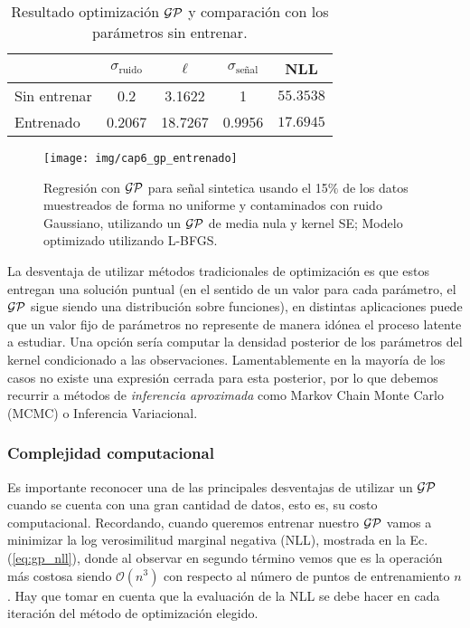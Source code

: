 \begin{table}[H]
\centering
\begin{tabular}{lcccc}
 & $\sigma_{\text{ruido}}$ & $\ell$ & $\sigma_{\text{señal}}$ & NLL\\ \hline
Sin entrenar & 0.2 & 3.1622 & 1 & $\mathbf{55.3538}$\\
Entrenado & 0.2067 & 18.7267 & 0.9956 & $\mathbf{17.6945}$\\
\end{tabular}
\caption{Resultado optimización $\mathcal{GP}$ y comparación con los parámetros sin entrenar.}
\label{tab:gp_1}
\end{table}


\begin{figure}[H]
	\centering
	\texttt{[image: img/cap6\_gp\_entrenado]}
	\caption{Regresión con $\mathcal{GP}$ para señal sintetica usando el 15$\%$ de los datos muestreados de forma no uniforme y contaminados con ruido Gaussiano, utilizando un $\mathcal{GP}$ de media nula y kernel SE; Modelo optimizado utilizando L-BFGS.}
	\label{fig:gp_5}
\end{figure}

La desventaja de utilizar métodos tradicionales de optimización es que estos entregan una solución puntual (en el sentido de un valor para cada parámetro, el $\mathcal{GP}$ sigue siendo una distribución sobre funciones), en distintas aplicaciones puede que un valor fijo de parámetros no represente de manera idónea el proceso latente a estudiar. Una opción sería computar la densidad posterior de los parámetros del kernel condicionado a las observaciones. Lamentablemente en la mayoría de los casos no existe una expresión cerrada para esta posterior, por lo que debemos recurrir a métodos de \textit{inferencia aproximada} como Markov Chain Monte Carlo (MCMC) o Inferencia Variacional.





\subsubsection{Complejidad computacional}

Es importante reconocer una de las principales desventajas de utilizar un $\mathcal{GP}$ cuando se cuenta con una gran cantidad de datos, esto es, su costo computacional.
Recordando, cuando queremos entrenar nuestro $\mathcal{GP}$ vamos a minimizar la log verosimilitud marginal negativa (NLL), mostrada en la Ec.(\ref{eq:gp_nll}), donde al observar en segundo término vemos que es la operación más costosa siendo $\mathcal{O}(n^3)$ con respecto al número de puntos de entrenamiento $n$. Hay que tomar en cuenta que la evaluación de la NLL se debe hacer en cada iteración del método de optimización elegido.

